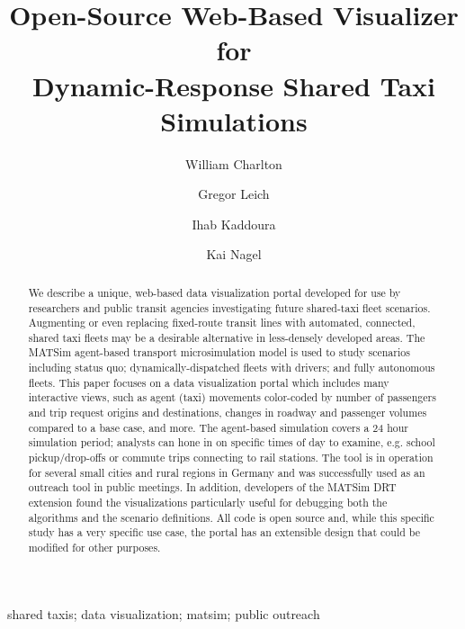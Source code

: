\documentclass[3p,times,procedia]{elsarticle}
\begin{document}
\begin{frontmatter}

%

\title{Open-Source Web-Based Visualizer for \\ Dynamic-Response Shared Taxi Simulations}

\author[a]{William Charlton}
\author[a]{Gregor Leich}
\author[a]{Ihab Kaddoura}
\author[a]{Kai Nagel}

\address[a]{Technische Universität Berlin, Chair of Transport Systems Planning and Transport Telematics, Straße des 17. Juni 135, 10623 Berlin, Germany}

\begin{abstract}

We describe a unique, web-based data visualization portal developed for use by researchers and public transit agencies investigating future shared-taxi fleet scenarios. Augmenting or even replacing fixed-route transit lines with automated, connected, shared taxi fleets may be a desirable alternative in less-densely developed areas. The MATSim agent-based transport microsimulation model is used to study scenarios including status quo; dynamically-dispatched fleets with drivers; and fully autonomous fleets. This paper focuses on a data visualization portal which includes many interactive views, such as agent (taxi) movements color-coded by number of passengers and trip request origins and destinations, changes in roadway and passenger volumes compared to a base case, and more. The agent-based simulation covers a 24 hour simulation period; analysts can hone in on specific times of day to examine, e.g. school pickup/drop-offs or commute trips connecting to rail stations. The tool is in operation for several small cities and rural regions in Germany and was successfully used as an outreach tool in public meetings. In addition, developers of the MATSim DRT extension found the visualizations particularly useful for debugging both the algorithms and the scenario definitions. All code is open source and, while this specific study has a very specific use case, the portal has an extensible design that could be modified for other purposes.

\end{abstract}

\begin{keyword}
shared taxis; data visualization; matsim; public outreach
\end{keyword}


\end{frontmatter}
\end{document}
